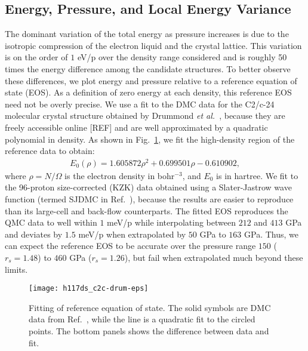 \subsection{Energy, Pressure, and Local Energy Variance}

The dominant variation of the total energy as pressure increases is due to the isotropic compression of the electron liquid and the crystal lattice. This variation is on the order of $1$ eV/p over the density range considered and is roughly 50 times the energy difference among the candidate structures.
To better observe these differences, we plot energy and pressure relative to a reference equation of state (EOS).
As a definition of zero energy at each density, this reference EOS need not be overly precise.
We use a fit to the DMC data for the C2/c-24 molecular crystal structure obtained by Drummond \textit{et al.}~\cite{Drummond2015}, because they are freely accessible online [REF] and are well approximated by a quadratic polynomial in density.
As shown in Fig.~\ref{fig:hsolid-drum-eos}, we fit the high-density region of the reference data to obtain:
\begin{align}
E_0(\rho) = 1.605872\rho^2 + 0.699501\rho - 0.610902,
\label{eq:hsolid-drum-ref}
\end{align}
where $\rho=N/\Omega$ is the electron density in bohr$^{-3}$, and $E_0$ is in hartree.
We fit to the 96-proton size-corrected (KZK) data obtained using a Slater-Jastrow wave function (termed SJDMC in Ref.~\cite{Drummond2015}), because the results are easier to reproduce than its large-cell and back-flow counterparts.
The fitted EOS reproduces the QMC data to well within $1$ meV/p while interpolating between $212$ and $413$ GPa and deviates by $1.5$ meV/p when extrapolated by $50$ GPa to $163$ GPa.
Thus, we can expect the reference EOS to be accurate over the pressure range $150$ ($r_s=1.48$) to $460$ GPa ($r_s=1.26$), but fail when extrapolated much beyond these limits.

\begin{figure}[h]
\centering
\texttt{[image: h117ds\_c2c-drum-eps]}
\caption{Fitting of reference equation of state. The solid symbols are DMC data from Ref.~\cite{Drummond2015}, while the line is a quadratic fit to the circled points. The bottom panels shows the difference between data and fit.}
\label{fig:hsolid-drum-eos}
\end{figure}

